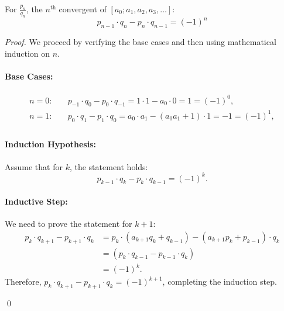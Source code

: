 \documentclass[a4paper]{article}
\begin{document}
\begin{lemma}
    \label{lemma3}
    For $\frac{p_{n}}{q_n}$, the $n^{\text{th}}$ convergent of $[a_0; a_1, a_2, a_3, \dots]$:
    \[
    p_{n-1} \cdot q_n - p_{n} \cdot q_{n-1} = (-1)^n
    \]
\end{lemma}

\begin{proof}
    We proceed by verifying the base cases and then using mathematical induction on \( n \).

    \paragraph{Base Cases:}
    \begin{align*}
        n = 0: \quad & p_{-1} \cdot q_0 - p_{0} \cdot q_{-1} = 1 \cdot 1 - a_0 \cdot 0 = 1 = (-1)^0, \\
        n = 1: \quad & p_{0} \cdot q_1 - p_{1} \cdot q_{0} = a_0 \cdot a_1 - (a_0 a_1 + 1) \cdot 1 = -1 = (-1)^1, \\
    \end{align*}

    \paragraph{Induction Hypothesis:} Assume that for \( k \), the statement holds:
    \[
    p_{k-1} \cdot q_k - p_{k} \cdot q_{k-1} = (-1)^k.
    \]

    \paragraph{Inductive Step:} We need to prove the statement for \( k+1 \):
    \begin{align*}
        p_{k} \cdot q_{k+1} - p_{k+1} \cdot q_{k} &= p_{k} \cdot (a_{k+1} q_{k} + q_{k-1}) - (a_{k+1} p_{k} + p_{k-1}) \cdot q_{k} \\
        &= \left( p_{k} \cdot q_{k-1} - p_{k-1} \cdot q_{k} \right) \\
        &= (-1)^k.
    \end{align*}
    Therefore, \( p_{k} \cdot q_{k+1} - p_{k+1} \cdot q_{k} = (-1)^{k+1} \), completing the induction step.

    \qed
\end{proof}
\end{document}
